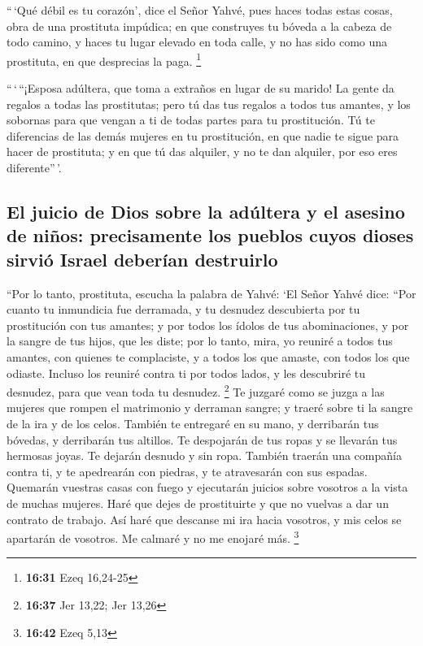  ``\,`Qué débil es tu corazón', dice el Señor Yahvé, pues
haces todas estas cosas, obra de una prostituta impúdica;
 en que construyes tu bóveda a la cabeza de todo camino,
y haces tu lugar elevado en toda calle, y no has sido como una
prostituta, en que desprecias la paga. \footnote{\textbf{16:31} Ezeq
  16,24-25}

 ``\,`\,``¡Esposa adúltera, que toma a extraños en lugar
de su marido!  La gente da regalos a todas las
prostitutas; pero tú das tus regalos a todos tus amantes, y los sobornas
para que vengan a ti de todas partes para tu prostitución.
 Tú te diferencias de las demás mujeres en tu
prostitución, en que nadie te sigue para hacer de prostituta; y en que
tú das alquiler, y no te dan alquiler, por eso eres diferente''\,'.

\hypertarget{el-juicio-de-dios-sobre-la-aduxfaltera-y-el-asesino-de-niuxf1os-precisamente-los-pueblos-cuyos-dioses-sirviuxf3-israel-deberuxedan-destruirlo}{%
\subsection{El juicio de Dios sobre la adúltera y el asesino de niños:
precisamente los pueblos cuyos dioses sirvió Israel deberían
destruirlo}\label{el-juicio-de-dios-sobre-la-aduxfaltera-y-el-asesino-de-niuxf1os-precisamente-los-pueblos-cuyos-dioses-sirviuxf3-israel-deberuxedan-destruirlo}}

 ``Por lo tanto, prostituta, escucha la palabra de Yahvé:
 `El Señor Yahvé dice: ``Por cuanto tu inmundicia fue
derramada, y tu desnudez descubierta por tu prostitución con tus
amantes; y por todos los ídolos de tus abominaciones, y por la sangre de
tus hijos, que les diste;  por lo tanto, mira, yo reuniré
a todos tus amantes, con quienes te complaciste, y a todos los que
amaste, con todos los que odiaste. Incluso los reuniré contra ti por
todos lados, y les descubriré tu desnudez, para que vean toda tu
desnudez. \footnote{\textbf{16:37} Jer 13,22; Jer 13,26} 
Te juzgaré como se juzga a las mujeres que rompen el matrimonio y
derraman sangre; y traeré sobre ti la sangre de la ira y de los celos.
 También te entregaré en su mano, y derribarán tus
bóvedas, y derribarán tus altillos. Te despojarán de tus ropas y se
llevarán tus hermosas joyas. Te dejarán desnudo y sin ropa.
 También traerán una compañía contra ti, y te apedrearán
con piedras, y te atravesarán con sus espadas.  Quemarán
vuestras casas con fuego y ejecutarán juicios sobre vosotros a la vista
de muchas mujeres. Haré que dejes de prostituirte y que no vuelvas a dar
un contrato de trabajo.  Así haré que descanse mi ira
hacia vosotros, y mis celos se apartarán de vosotros. Me calmaré y no me
enojaré más. \footnote{\textbf{16:42} Ezeq 5,13}

